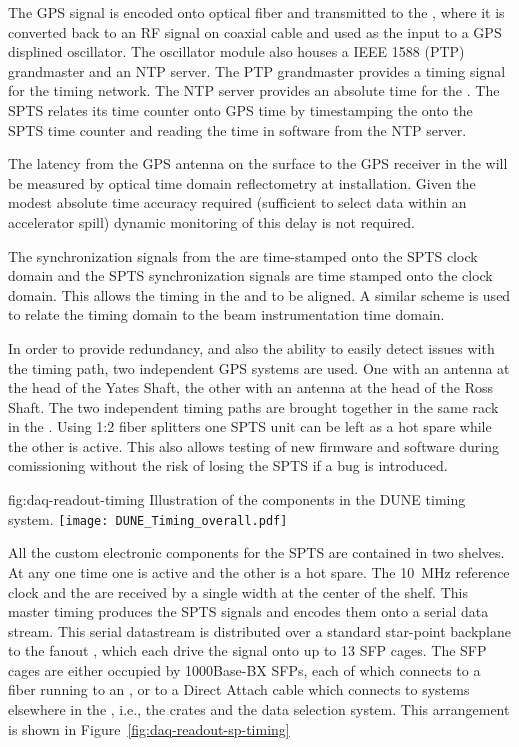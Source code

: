 The GPS signal is encoded onto optical fiber and transmitted to the
, where it is converted back to an RF signal on coaxial cable and
used as the input to a GPS displined oscillator. The oscillator module
also houses a IEEE 1588 (PTP) grandmaster and an NTP server. The PTP
grandmaster provides a timing signal for the  
timing network. The NTP server provides an absolute time for the
. The SPTS relates its time counter onto GPS time by
timestamping the  onto the SPTS time counter and reading
the time in software from the NTP server.

The latency from the GPS antenna on the surface to the GPS receiver in
the  will be measured by optical time domain reflectometry at
installation. Given the modest absolute time accuracy required
(sufficient to select data within an accelerator spill) dynamic
monitoring of this delay is not required.

The  synchronization signals from the   are
time-stamped onto the SPTS clock domain and the SPTS synchronization
signals are time stamped onto the  clock domain. This allows
the timing in the  and   to be
aligned. A similar scheme is used to relate the 
 timing domain to the beam instrumentation
 time domain.

In order to provide redundancy, and also the ability to easily detect
issues with the timing path, two independent GPS systems are used. One
with an antenna at the head of the Yates Shaft, the other with an
antenna at the head of the Ross Shaft. The two independent timing
paths are brought together in the same rack in the . Using 1:2
fiber splitters one SPTS unit can be left as a hot spare while the
other is active. This also allows testing of new firmware and software
during comissioning without the risk of losing the SPTS if a bug is
introduced.


\begin{dunefigure}{fig:daq-readout-timing}
  {Illustration of the components in the DUNE timing system.}
\texttt{[image: DUNE\_Timing\_overall.pdf]}
\end{dunefigure}

All the custom electronic components for the SPTS are contained in two
 shelves. At any one time one is active and the other is a
hot spare. The \SI{10}{\MHz} reference clock and the  are received
by a single width  at the center of the  shelf. This
master timing  produces the SPTS signals and encodes them onto a
serial data stream. This serial datastream is distributed over a
standard star-point backplane to the fanout , which each drive the
signal onto up to \num{13} SFP cages. The SFP cages are either occupied by
1000Base-BX SFPs, each of which connects to a fiber running to an ,
or to a Direct Attach cable which connects to systems elsewhere in the
,  i.e., the  crates and the data selection system. This
arrangement is shown in Figure~\ref{fig:daq-readout-sp-timing}


